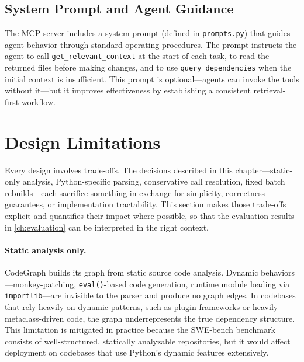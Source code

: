 \subsection{System Prompt and Agent Guidance}
\label{sec:system-prompt}

The MCP server includes a system prompt (defined in \texttt{prompts.py}) that guides agent behavior through standard operating procedures. The prompt instructs the agent to call \texttt{get\_relevant\_context} at the start of each task, to read the returned files before making changes, and to use \texttt{query\_dependencies} when the initial context is insufficient. This prompt is optional---agents can invoke the tools without it---but it improves effectiveness by establishing a consistent retrieval-first workflow.


\section{Design Limitations}
\label{sec:design-limitations}

Every design involves trade-offs. The decisions described in this chapter---static-only analysis, Python-specific parsing, conservative call resolution, fixed batch rebuilds---each sacrifice something in exchange for simplicity, correctness guarantees, or implementation tractability. This section makes those trade-offs explicit and quantifies their impact where possible, so that the evaluation results in \cref{ch:evaluation} can be interpreted in the right context.

\paragraph{Static analysis only.} CodeGraph builds its graph from static source code analysis. Dynamic behaviors---monkey-patching, \texttt{eval()}-based code generation, runtime module loading via \texttt{importlib}---are invisible to the parser and produce no graph edges. In codebases that rely heavily on dynamic patterns, such as plugin frameworks or heavily metaclass-driven code, the graph underrepresents the true dependency structure. This limitation is mitigated in practice because the SWE-bench benchmark consists of well-structured, statically analyzable repositories, but it would affect deployment on codebases that use Python's dynamic features extensively.

